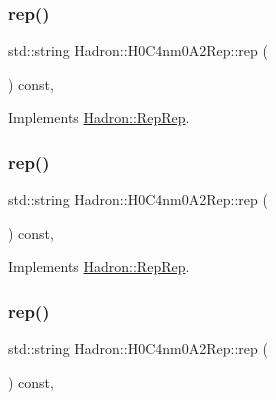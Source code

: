 \subsubsection{\texorpdfstring{rep()}{rep()}\hspace{0.1cm}{\footnotesize\ttfamily [1/3]}}
{\footnotesize\ttfamily std\+::string Hadron\+::\+H0\+C4nm0\+A2\+Rep\+::rep (\begin{DoxyParamCaption}{ }\end{DoxyParamCaption}) const\hspace{0.3cm}{\ttfamily [inline]}, {\ttfamily [virtual]}}



Implements \mbox{\hyperlink{structHadron_1_1RepRep_ab3213025f6de249f7095892109575fde}{Hadron\+::\+Rep\+Rep}}.

\mbox{\label{structHadron_1_1H0C4nm0A2Rep_a82046f2360bc0682e6b0f7ce6b03286c}} 
\subsubsection{\texorpdfstring{rep()}{rep()}\hspace{0.1cm}{\footnotesize\ttfamily [2/3]}}
{\footnotesize\ttfamily std\+::string Hadron\+::\+H0\+C4nm0\+A2\+Rep\+::rep (\begin{DoxyParamCaption}{ }\end{DoxyParamCaption}) const\hspace{0.3cm}{\ttfamily [inline]}, {\ttfamily [virtual]}}



Implements \mbox{\hyperlink{structHadron_1_1RepRep_ab3213025f6de249f7095892109575fde}{Hadron\+::\+Rep\+Rep}}.

\mbox{\label{structHadron_1_1H0C4nm0A2Rep_a82046f2360bc0682e6b0f7ce6b03286c}} 
\subsubsection{\texorpdfstring{rep()}{rep()}\hspace{0.1cm}{\footnotesize\ttfamily [3/3]}}
{\footnotesize\ttfamily std\+::string Hadron\+::\+H0\+C4nm0\+A2\+Rep\+::rep (\begin{DoxyParamCaption}{ }\end{DoxyParamCaption}) const\hspace{0.3cm}{\ttfamily [inline]}, {\ttfamily [virtual]}}



